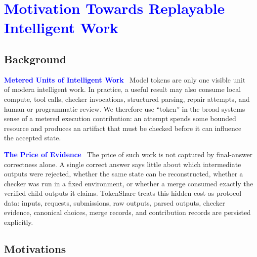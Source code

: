 \documentclass{article}
\theoremstyle{plain}
\begin{document}
\section{\textcolor{blue}{Motivation Towards Replayable Intelligent Work}}


\subsection{Background}

\textbf{\textcolor{blue}{Metered Units of Intelligent Work}}~
{\color{blue}
Model tokens are only one visible unit of modern intelligent work. In practice, a useful result may also consume local compute, tool calls, checker invocations, structured parsing, repair attempts, and human or programmatic review. We therefore use ``token'' in the broad systems sense of a metered execution contribution: an attempt spends some bounded resource and produces an artifact that must be checked before it can influence the accepted state.
}

\textbf{\textcolor{blue}{The Price of Evidence}}~
{\color{blue}
The price of such work is not captured by final-answer correctness alone. A single correct answer says little about which intermediate outputs were rejected, whether the same state can be reconstructed, whether a checker was run in a fixed environment, or whether a merge consumed exactly the verified child outputs it claims. TokenShare treats this hidden cost as protocol data: inputs, requests, submissions, raw outputs, parsed outputs, checker evidence, canonical choices, merge records, and contribution records are persisted explicitly.
}


\subsection{Motivations}
\end{document}

